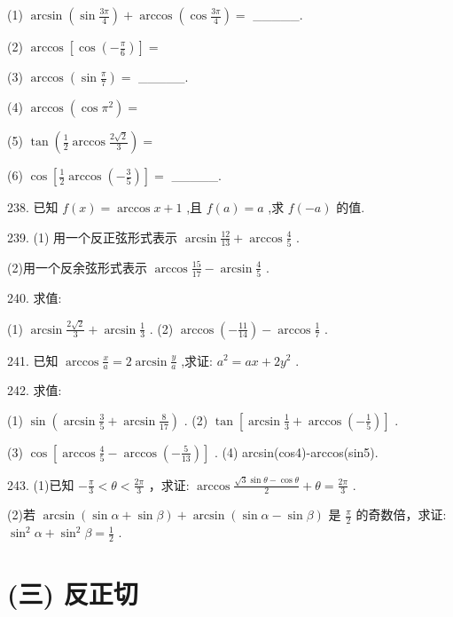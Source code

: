\documentclass[10pt]{article}
\begin{document}
(1) \(\arcsin \left( {\sin \frac{3\pi }{4}}\right)  + \arccos \left( {\cos \frac{3\pi }{4}}\right)  =\) \_\_\_\_\_.

(2) \(\arccos \left\lbrack  {\cos \left( {-\frac{\pi }{6}}\right) }\right\rbrack   =\)

(3) \(\arccos \left( {\sin \frac{\pi }{7}}\right)  =\) \_\_\_\_\_.

(4) \(\arccos \left( {\cos {\pi }^{2}}\right)  =\)

(5) \(\tan \left( {\frac{1}{2}\arccos \frac{2\sqrt{2}}{3}}\right)  =\)

(6) \(\cos \left\lbrack  {\frac{1}{2}\arccos \left( {-\frac{3}{5}}\right) }\right\rbrack   =\) \_\_\_\_\_.

238. 已知 \(f\left( x\right)  = \arccos x + 1\) ,且 \(f\left( a\right)  = a\) ,求 \(f\left( {-a}\right)\) 的值.

239. (1) 用一个反正弦形式表示 \(\arcsin \frac{12}{13} + \arccos \frac{4}{5}\) .

(2)用一个反余弦形式表示 \(\arccos \frac{15}{17} - \arcsin \frac{4}{5}\) .

240. 求值:

(1) \(\arcsin \frac{2\sqrt{2}}{3} + \arcsin \frac{1}{3}\) . (2) \(\arccos \left( {-\frac{11}{14}}\right)  - \arccos \frac{1}{7}\) .

241. 已知 \(\arccos \frac{x}{a} = 2\arcsin \frac{y}{a}\) ,求证: \({a}^{2} = {ax} + 2{y}^{2}\) .

242. 求值:

(1) \(\sin \left( {\arcsin \frac{3}{5} + \arcsin \frac{8}{17}}\right)\) . (2) \(\tan \left\lbrack  {\arcsin \frac{1}{3} + \arccos \left( {-\frac{1}{5}}\right) }\right\rbrack\) .

(3) \(\cos \left\lbrack  {\arccos \frac{4}{5} - \arccos \left( {-\frac{5}{13}}\right) }\right\rbrack\) . (4) arcsin(cos4)-arccos(sin5).

243. (1)已知 \(- \frac{\pi }{3} < \theta  < \frac{2\pi }{3}\) ，求证: \(\arccos \frac{\sqrt{3}\sin \theta  - \cos \theta }{2} + \theta  = \frac{2\pi }{3}\) .

(2)若 \(\arcsin \left( {\sin \alpha  + \sin \beta }\right)  + \arcsin \left( {\sin \alpha  - \sin \beta }\right)\) 是 \(\frac{\pi }{2}\) 的奇数倍，求证: \({\sin }^{2}\alpha  + {\sin }^{2}\beta  = \frac{1}{2}\) .

\section*{(三) 反正切}
\end{document}
